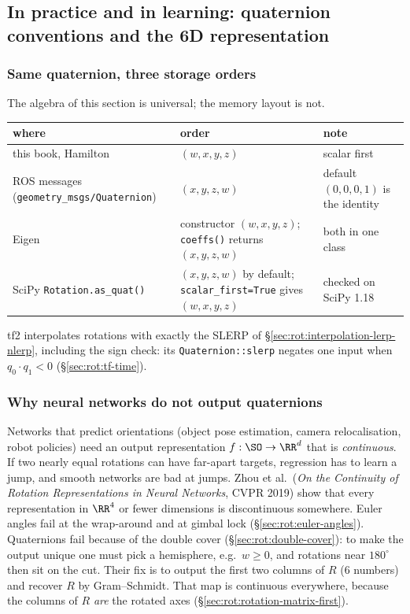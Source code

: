 \subsection{In practice and in learning: quaternion conventions and the 6D representation}\label{sec:rot:quat-in-practice}

\subsubsection{Same quaternion, three storage orders}
The algebra of this section is universal; the memory layout is not.
\begin{center}\small
\begin{tabularx}{\linewidth}{@{}>{\raggedright\arraybackslash}p{5.2cm}>{\raggedright\arraybackslash}X>{\raggedright\arraybackslash}p{3.6cm}@{}}\toprule
where & order & note\\\midrule
this book, Hamilton & $(w,x,y,z)$ & scalar first\\
ROS messages (\texttt{geometry\_msgs/Quaternion}) & $(x,y,z,w)$ & default $(0,0,0,1)$ is the identity\\
Eigen & constructor $(w,x,y,z)$; \texttt{coeffs()} returns $(x,y,z,w)$ & both in one class\\
SciPy \texttt{Rotation.as\_quat()} & $(x,y,z,w)$ by default; \texttt{scalar\_first=True} gives $(w,x,y,z)$ & checked on SciPy 1.18\\\bottomrule
\end{tabularx}
\end{center}
tf2 interpolates rotations with exactly the SLERP of \S\ref{sec:rot:interpolation-lerp-nlerp}, including the sign check: its \texttt{Quaternion::slerp} negates one input when $q_0\cdot q_1<0$ (\S\ref{sec:rot:tf-time}).

\subsubsection{Why neural networks do not output quaternions}
Networks that predict orientations (object pose estimation, camera relocalisation, robot policies) need an output representation $f:\SO\to\RR^d$ that is \emph{continuous}. If two nearly equal rotations can have far-apart targets, regression has to learn a jump, and smooth networks are bad at jumps. Zhou et al.\ (\emph{On the Continuity of Rotation Representations in Neural Networks}, CVPR 2019) show that every representation in $\RR^4$ or fewer dimensions is discontinuous somewhere. Euler angles fail at the wrap-around and at gimbal lock (\S\ref{sec:rot:euler-angles}). Quaternions fail because of the double cover (\S\ref{sec:rot:double-cover}): to make the output unique one must pick a hemisphere, e.g.\ $w\ge0$, and rotations near $180^\circ$ then sit on the cut. Their fix is to output the first two columns of $R$ (6 numbers) and recover $R$ by Gram--Schmidt. That map is continuous everywhere, because the columns of $R$ \emph{are} the rotated axes (\S\ref{sec:rot:rotation-matrix-first}).

